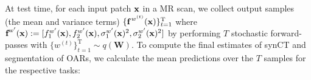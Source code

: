 


At test time, for each input patch $\textbf{\text{x}}$ in a MR scan, we collect output samples (the mean and variance terms) $\{\textbf{f}^{\,w^{(t)}}(\text{\textbf{x}})\}_{t=1}^{\text{T}}$ where $\textbf{f}^{w'}(\text{\textbf{x}}):=[f^{w'}_1(\text{\textbf{x}}),f^{w'}_2(\text{\textbf{x}}), \sigma_{1}^{w'}(\text{\textbf{x}})^{2},\sigma_{2}^{w'}(\text{\textbf{x}})^{2}]$ by performing $T$ stochastic forward-passes with $\{w^{(t)}\}_{t=1}^{\text{T}}\sim q(\mathbf{W})$. 
To compute the final estimates of synCT and segmentation of OARs, we calculate the mean predictions over the $T$ samples for the respective tasks: 

